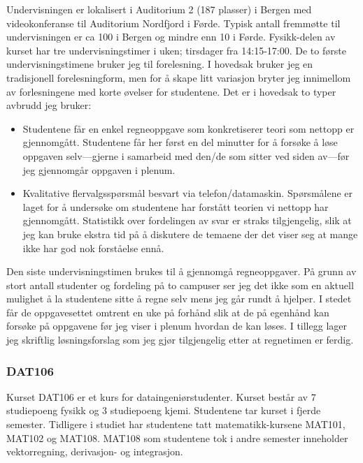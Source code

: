 \documentclass[a4paper,norsk,12pt]{article}
\begin{document}
Undervisningen er lokalisert i Auditorium 2 (187 plasser) i Bergen med videokonferanse til Auditorium Nordfjord i Førde. Typisk antall fremmøtte til undervisningen er ca 100 i Bergen og mindre enn 10 i Førde. Fysikk-delen av kurset har tre undervisningstimer i uken; tirsdager fra 14:15-17:00. De to første undervisningstimene bruker jeg til forelesning. I hovedsak bruker jeg en tradisjonell forelesningform, men for å skape litt variasjon bryter jeg innimellom av forlesningene med korte øvelser for studentene. Det er i hovedsak to typer avbrudd jeg bruker:
\begin{itemize}
\item
Studentene får en enkel regneoppgave som konkretiserer teori som nettopp er gjennomgått. Studentene får her først en del minutter for å forsøke å løse oppgaven selv---gjerne i samarbeid med den/de som sitter ved siden av---før jeg gjennomgår oppgaven i plenum.
\item
Kvalitative flervalgsspørsmål besvart via telefon/datamaskin. Spørsmålene er laget for å undersøke om studentene har forstått teorien vi nettopp har gjennomgått. Statistikk over fordelingen av svar er straks tilgjengelig, slik at jeg kan bruke ekstra tid på å diskutere de temaene der det viser seg at mange ikke har god nok forståelse ennå.
\end{itemize}
Den siste undervisningstimen brukes til å gjennomgå regneoppgaver. På grunn av stort antall studenter og fordeling på to campuser ser jeg det ikke som en aktuell mulighet å la studentene sitte å regne selv mens jeg går rundt å hjelper. I stedet får de oppgavesettet omtrent en uke på forhånd slik at de på egenhånd kan forsøke på oppgavene før jeg viser i plenum hvordan de kan løses. I tillegg lager jeg skriftlig løsningsforslag som jeg gjør tilgjengelig etter at regnetimen er ferdig.

\subsubsection{DAT106}
Kurset DAT106 er et kurs for dataingeniørstudenter. Kurset består av 7 studiepoeng fysikk og 3 studiepoeng kjemi. Studentene tar kurset i fjerde semester. Tidligere i studiet har studentene tatt matematikk-kursene MAT101, MAT102 og MAT108. MAT108 som studentene tok i andre semester inneholder vektorregning, derivasjon- og integrasjon.
\end{document}
